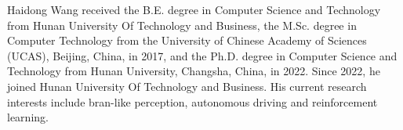 \documentclass[lettersize,journal]{IEEEtran}
\begin{document}
\newpage
\begin{IEEEbiography}{Haidong Wang}
	 received the B.E. degree in Computer Science and Technology from Hunan University Of Technology and Business, the M.Sc. degree in Computer Technology from the University of Chinese Academy of Sciences (UCAS), Beijing, China, in 2017, and the Ph.D. degree in Computer Science and Technology from Hunan University, Changsha, China, in 2022. Since 2022, he joined Hunan University Of Technology and Business. His current research interests include bran-like perception, autonomous driving and reinforcement learning.
\end{IEEEbiography}


\vfill
\end{document}
